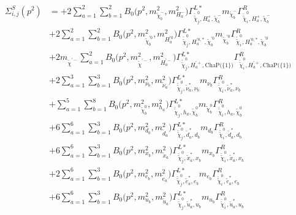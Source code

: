 \begin{itemize}
\begin{align} 
\Sigma^S_{i,j}(p^2) &= +2 \sum_{a=1}^{2}\sum_{b=1}^{2}{B_0\Big(p^{2},m^2_{\tilde{\chi}^-_{{b}}},m^2_{H^-_{{a}}}\Big)} {\Gamma^{L*}_{\check{\tilde{\chi}}^0_{{j}},H^+_{{a}},\tilde{\chi}^-_{{b}}}} m_{\tilde{\chi}^-_{{b}}} {\Gamma^R_{\check{\tilde{\chi}}^0_{{i}},H^+_{{a}},\tilde{\chi}^-_{{b}}}}  \nonumber \\ 
 &+2 \sum_{a=1}^{2}\sum_{b=1}^{2}{B_0\Big(p^{2},m^2_{\tilde{\chi}^{'0}_{{b}}},m^2_{H^{'0}_{{a}}}\Big)} {\Gamma^{L*}_{\check{\tilde{\chi}}^0_{{j}},H^{{'0},*}_{{a}},\tilde{\chi}^{'0}_{{b}}}} m_{\tilde{\chi}^{'0}_{{b}}} {\Gamma^R_{\check{\tilde{\chi}}^0_{{i}},H^{{'0},*}_{{a}},\tilde{\chi}^{'0}_{{b}}}}  \nonumber \\ 
 &+2 m_{\tilde{\chi}^{'-}} \sum_{a=1}^{2}{B_0\Big(p^{2},m^2_{\tilde{\chi}^{'-}},m^2_{H^{'-}_{{a}}}\Big)} {\Gamma^{L*}_{\check{\tilde{\chi}}^0_{{j}},H^{'+}_{{a}},\text{ChaP}\Big(\{1\}\Big)}} {\Gamma^R_{\check{\tilde{\chi}}^0_{{i}},H^{'+}_{{a}},\text{ChaP}\Big(\{1\}\Big)}}  \nonumber \\ 
 &+2 \sum_{a=1}^{3}\sum_{b=1}^{3}{B_0\Big(p^{2},m^2_{\nu_{{b}}},m^2_{\tilde{\nu}_{{a}}}\Big)} {\Gamma^{L*}_{\check{\tilde{\chi}}^0_{{j}},\tilde{\nu}^*_{{a}},\nu_{{b}}}} m_{\nu_{{b}}} {\Gamma^R_{\check{\tilde{\chi}}^0_{{i}},\tilde{\nu}^*_{{a}},\nu_{{b}}}}  \nonumber \\ 
 &+\sum_{a=1}^{5}\sum_{b=1}^{8}{B_0\Big(p^{2},m^2_{\tilde{\chi}^0_{{b}}},m^2_{h_{{a}}}\Big)} {\Gamma^{L*}_{\check{\tilde{\chi}}^0_{{j}},h_{{a}},\tilde{\chi}^0_{{b}}}} m_{\tilde{\chi}^0_{{b}}} {\Gamma^R_{\check{\tilde{\chi}}^0_{{i}},h_{{a}},\tilde{\chi}^0_{{b}}}} \nonumber \\ 
 &+6 \sum_{a=1}^{6}\sum_{b=1}^{3}{B_0\Big(p^{2},m^2_{d_{{b}}},m^2_{\tilde{d}_{{a}}}\Big)} {\Gamma^{L*}_{\check{\tilde{\chi}}^0_{{j}},\tilde{d}^*_{{a}},d_{{b}}}} m_{d_{{b}}} {\Gamma^R_{\check{\tilde{\chi}}^0_{{i}},\tilde{d}^*_{{a}},d_{{b}}}}  \nonumber \\ 
 &+6 \sum_{a=1}^{6}\sum_{b=1}^{3}{B_0\Big(p^{2},m^2_{x_{{b}}},m^2_{\tilde{x}_{{a}}}\Big)} {\Gamma^{L*}_{\check{\tilde{\chi}}^0_{{j}},\tilde{x}^*_{{a}},x_{{b}}}} m_{x_{{b}}} {\Gamma^R_{\check{\tilde{\chi}}^0_{{i}},\tilde{x}^*_{{a}},x_{{b}}}}  \nonumber \\ 
 &+2 \sum_{a=1}^{6}\sum_{b=1}^{3}{B_0\Big(p^{2},m^2_{e_{{b}}},m^2_{\tilde{e}_{{a}}}\Big)} {\Gamma^{L*}_{\check{\tilde{\chi}}^0_{{j}},\tilde{e}^*_{{a}},e_{{b}}}} m_{e_{{b}}} {\Gamma^R_{\check{\tilde{\chi}}^0_{{i}},\tilde{e}^*_{{a}},e_{{b}}}}  \nonumber \\ 
 &+6 \sum_{a=1}^{6}\sum_{b=1}^{3}{B_0\Big(p^{2},m^2_{u_{{b}}},m^2_{\tilde{u}_{{a}}}\Big)} {\Gamma^{L*}_{\check{\tilde{\chi}}^0_{{j}},\tilde{u}^*_{{a}},u_{{b}}}} m_{u_{{b}}} {\Gamma^R_{\check{\tilde{\chi}}^0_{{i}},\tilde{u}^*_{{a}},u_{{b}}}}  \nonumber \\ 

\end{align}
\end{itemize}
